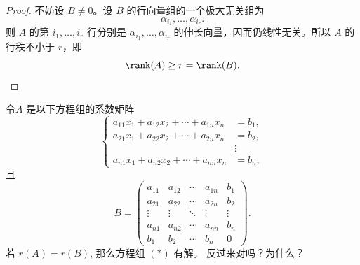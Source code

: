 \begin{proof}
	不妨设 $B\neq0$。设 $B$ 的行向量组的一个极大无关组为
	\[
	\alpha_{i_1},\ldots,\alpha_{i_r}.
	\]
	则 $A$ 的第 $i_1,\ldots,i_r$ 行分别是
	$\alpha_{i_1},\ldots,\alpha_{i_r}$ 的伸长向量，因而仍线性无关。所以 $A$ 的行秩不小于 $r$，即
	\[
	\rank(A)\geq r=\rank(B).
	\]
\end{proof}

\begin{problem}
	令$A$ 是以下方程组的系数矩阵
	\begin{equation}\tag{*}
		\left\{
		\begin{aligned}
			a_{11}x_1+a_{12}x_2+\cdots+a_{1n}x_n&=b_1,\\
			a_{21}x_1+a_{22}x_2+\cdots+a_{2n}x_n&=b_2,\\
			&\vdots\\
			a_{n1}x_1+a_{n2}x_2+\cdots+a_{nn}x_n&=b_n,
		\end{aligned}
		\right.
	\end{equation}
	且
	\[
	B=
	\begin{pmatrix}
		a_{11}&a_{12}&\cdots&a_{1n}&b_1\\
		a_{21}&a_{22}&\cdots&a_{2n}&b_2\\
		\vdots&\vdots&\ddots&\vdots&\vdots\\
		a_{n1}&a_{n2}&\cdots&a_{nn}&b_n\\
		b_1&b_2&\cdots&b_n&0
	\end{pmatrix}.
	\]
	若 $r(A)=r(B)$, 那么方程组 $(*)$ 有解。 反过来对吗？为什么？
\end{problem}

